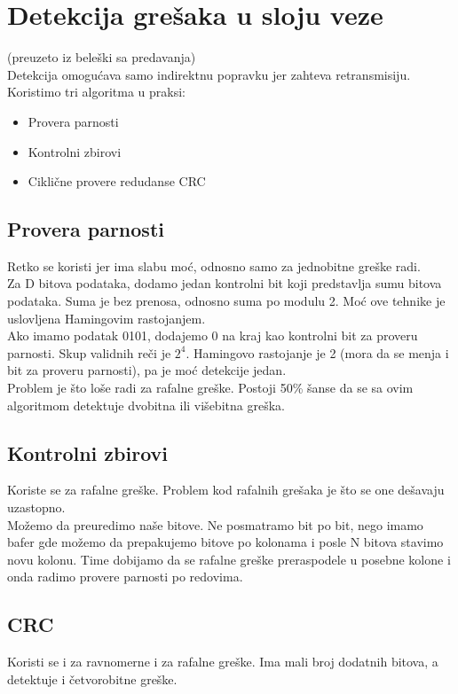 \documentclass{article} %
\begin{document}
\section{Detekcija grešaka u sloju veze}
(preuzeto iz beleški sa predavanja)\\

Detekcija omogućava samo indirektnu  popravku jer zahteva retransmisiju. Koristimo tri algoritma u praksi:
\begin{itemize}
  \item Provera parnosti
  \item Kontrolni zbirovi
  \item Ciklične provere redudanse CRC
\end{itemize}
\subsection{Provera parnosti}
Retko se koristi jer ima slabu moć, odnosno samo za jednobitne greške radi.\\
Za D bitova podataka, dodamo jedan kontrolni bit koji predstavlja sumu bitova podataka. Suma je bez prenosa, odnosno suma po modulu 2. Moć ove tehnike je uslovljena Hamingovim rastojanjem. \\
Ako imamo podatak 0101, dodajemo 0 na kraj kao kontrolni bit za proveru parnosti. Skup validnih reči je $ 2^{4} $. Hamingovo rastojanje je 2 (mora da se menja i bit za proveru parnosti), pa je moć detekcije jedan. \\
 Problem je što loše radi za rafalne greške. Postoji 50\% šanse da se sa ovim algoritmom detektuje dvobitna ili višebitna greška.
 
\subsection{Kontrolni zbirovi}
Koriste se za rafalne greške. Problem kod rafalnih grešaka je što se one dešavaju uzastopno.\\
Možemo da preuredimo naše bitove. Ne posmatramo bit po bit, nego imamo bafer gde možemo da prepakujemo bitove po kolonama i posle N bitova stavimo novu kolonu. Time dobijamo da se rafalne greške preraspodele u posebne kolone i onda radimo provere parnosti po redovima. 
\subsection{CRC}
Koristi se i za ravnomerne i za rafalne greške. Ima mali broj dodatnih bitova, a detektuje i četvorobitne greške.
\end{document}
